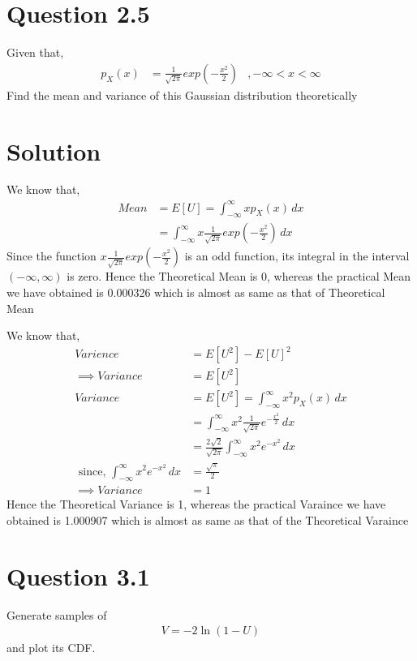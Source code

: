 \documentclass[16pt, a4paper, two column]{article}
\providecommand{\brak}[1]{\ensuremath{\left(#1\right)}}
\begin{document}
\section*{Question 2.5}
Given that,
\begin{align}
	p_X(x) &= \frac{1}{\sqrt{2\pi}}exp(-\frac{x^2}{2}) &, -\infty < x < \infty
\end{align}
Find the mean and variance of this Gaussian distribution theoretically
\section*{Solution}
We know that,
\begin{align}
	Mean &= E[U] = \int_{-\infty}^{\infty} x p_X(x) \, dx\\
	&= \int_{-\infty}^{\infty} x \frac{1}{\sqrt{2\pi}}exp(-\frac{x^2}{2}) \, dx
\end{align}
Since the function $x \frac{1}{\sqrt{2\pi}}exp(-\frac{x^2}{2})$ is an odd function, its integral in the interval $(-\infty, \infty)$ is zero.
Hence the Theoretical Mean is 0, whereas the practical Mean we have obtained is 0.000326 which is almost as same as that of Theoretical Mean\newline

We know that,
\begin{align}
	Varience &= E[U^2] - E[U]^2 \\
	\implies Variance &= E[U^2] \\
	Variance &= E[U^2] = \int_{-\infty}^{\infty} x^2 p_X(x) \, dx \\
	&= \int_{-\infty}^{\infty} x^2 \frac{1}{\sqrt{2\pi}}e^{-\frac{x^2}{2}} \,dx \\
	&= \frac{2\sqrt{2} }{\sqrt{2\pi}} \int_{-\infty}^{\infty} x^2 e^{-x^2} \, dx \\
	\text{ since, } \int_{-\infty}^{\infty} x^2 e^{-x^2} \, dx &= \frac{\sqrt{\pi}}{2} \\
	\implies Variance &= 1
\end{align}
Hence the Theoretical Variance is 1, whereas the practical Varaince we have obtained is 1.000907 which is almost as same as that of the Theoretical Varaince\newline
\section*{Question 3.1}
Generate samples of 
\begin{align}
V = -2\ln\brak{1-U}
\end{align}
and plot its CDF.
\end{document}

